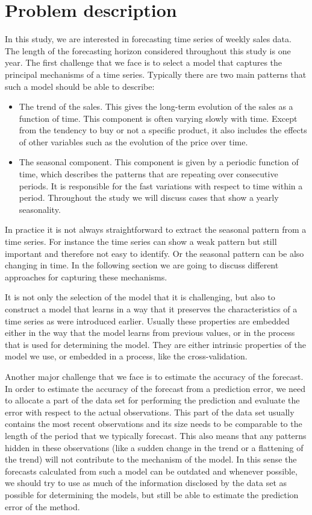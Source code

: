 \documentclass[12pt, letterpaper]{article}\usepackage[]{graphicx}\usepackage[]{color}
\begin{document}
\section{Problem description}
In this study, we are interested in forecasting time series of weekly sales data. The length of the forecasting horizon considered throughout this study is one year. The first challenge that we face is to select a model that captures the principal mechanisms of a time series. Typically there are two main patterns that such a model should be able to describe:
\begin{itemize}
\item The trend of the sales. This gives the long-term evolution of the sales as a function of time. This component is often varying slowly with time. Except from the tendency to buy or not a specific product, it also includes the effects of other variables such as the evolution of the price over time.
\item The seasonal component. This component is given by a periodic function of time, which describes the patterns that are repeating over consecutive periods. It is responsible for the fast variations with respect to time within a period. Throughout the study we will discuss cases that show a yearly seasonality.
\end{itemize}
In practice it is not always straightforward to extract the seasonal pattern from a time series. For instance the time series can show a weak pattern but still important and therefore not easy to identify. Or the seasonal pattern can be also changing in time. In the following section we are going to discuss different approaches for capturing these mechanisms.

It is not only the selection of the model that it is challenging, but also to construct a model that learns in a way that it preserves the characteristics of a time series as were introduced earlier. Usually these properties are embedded either in the way that the model learns from previous values, or in the process that is used for determining the model. They are either intrinsic properties of the model we use, or embedded in a process, like the cross-validation.  

Another major challenge that we face is to estimate the accuracy of the forecast. In order to estimate the accuracy of the forecast from a prediction error, we need to allocate a part of the data set for performing the prediction and evaluate the error with respect to the actual observations. This part of the data set usually contains the most recent observations and its size needs to be comparable to the length of the period that we typically forecast. This also means that any patterns hidden in these observations (like a sudden change in the trend or a flattening of the trend) will not contribute to the mechanism of the model. In this sense the forecasts calculated from such a model can be outdated and whenever possible, we should try to use as much of the information disclosed by the data set as possible for determining the models, but still be able to estimate the prediction error of the method. 
\end{document}
